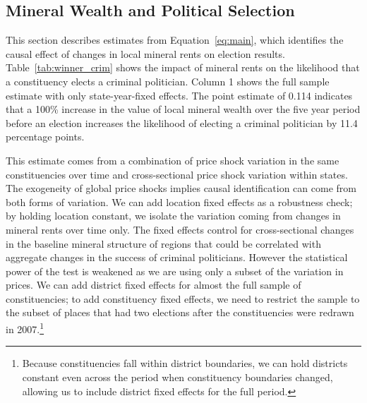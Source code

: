 \documentclass[12pt,letterpaper]{article}
\begin{document}
\subsection{Mineral Wealth and Political Selection}

This section describes estimates from Equation~\ref{eq:main}, which
identifies the causal effect of changes in local mineral rents on
election results. Table~\ref{tab:winner_crim} shows the impact of
mineral rents on the likelihood that a constituency elects a criminal
politician. Column 1 shows the full sample estimate with only
state-year-fixed effects. The point estimate of 0.114 indicates that a
100\% increase in the value of local mineral wealth over the five year
period before an election increases the likelihood of electing a
criminal politician by 11.4 percentage points.

This estimate comes from a combination of price shock variation in the
same constituencies over time and cross-sectional price shock
variation within states. The exogeneity of global price shocks implies
causal identification can come from both forms of variation. We can
add location fixed effects as a robustness check; by holding location
constant, we isolate the variation coming from changes in mineral
rents over time only. The fixed effects control for
cross-sectional changes in the baseline mineral structure of regions that
could be correlated with aggregate changes in the success of criminal
politicians. However the statistical power of the test is weakened as
we are using only a subset of the variation in prices. We can add
district fixed effects for almost the full sample of constituencies;
to add constituency fixed effects, we need to restrict the sample to
the subset of places that had two elections after the constituencies
were redrawn in 2007.\footnote{Because constituencies fall within
  district boundaries, we can hold districts constant even across the
  period when constituency boundaries changed, allowing us to include
  district fixed effects for the full period.}
\end{document}
